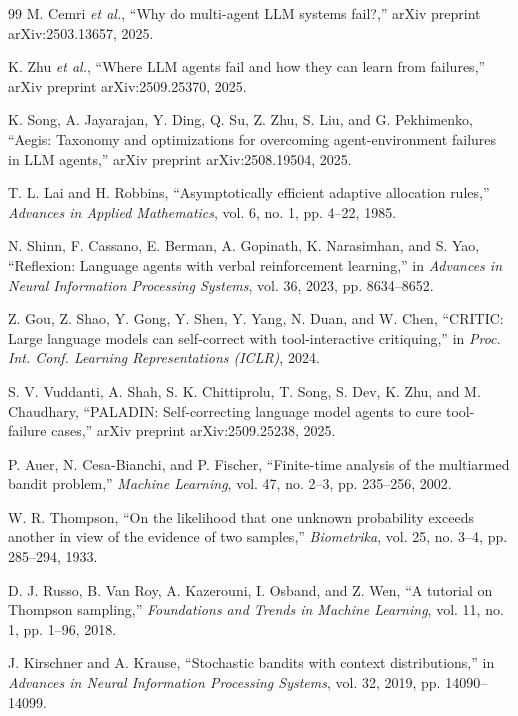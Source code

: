 \documentclass[conference]{IEEEtran}
\begin{document}
\begin{thebibliography}{99}
M. Cemri \emph{et al.}, ``Why do multi-agent LLM systems fail?,'' arXiv preprint arXiv:2503.13657, 2025.

K. Zhu \emph{et al.}, ``Where LLM agents fail and how they can learn from failures,'' arXiv preprint arXiv:2509.25370, 2025.

K. Song, A. Jayarajan, Y. Ding, Q. Su, Z. Zhu, S. Liu, and G. Pekhimenko, ``Aegis: Taxonomy and optimizations for overcoming agent-environment failures in LLM agents,'' arXiv preprint arXiv:2508.19504, 2025.

T. L. Lai and H. Robbins, ``Asymptotically efficient adaptive allocation rules,'' \emph{Advances in Applied Mathematics}, vol. 6, no. 1, pp. 4--22, 1985.

N. Shinn, F. Cassano, E. Berman, A. Gopinath, K. Narasimhan, and S. Yao, ``Reflexion: Language agents with verbal reinforcement learning,'' in \emph{Advances in Neural Information Processing Systems}, vol. 36, 2023, pp. 8634--8652.

Z. Gou, Z. Shao, Y. Gong, Y. Shen, Y. Yang, N. Duan, and W. Chen, ``CRITIC: Large language models can self-correct with tool-interactive critiquing,'' in \emph{Proc. Int. Conf. Learning Representations (ICLR)}, 2024.

S. V. Vuddanti, A. Shah, S. K. Chittiprolu, T. Song, S. Dev, K. Zhu, and M. Chaudhary, ``PALADIN: Self-correcting language model agents to cure tool-failure cases,'' arXiv preprint arXiv:2509.25238, 2025.

P. Auer, N. Cesa-Bianchi, and P. Fischer, ``Finite-time analysis of the multiarmed bandit problem,'' \emph{Machine Learning}, vol. 47, no. 2--3, pp. 235--256, 2002.

W. R. Thompson, ``On the likelihood that one unknown probability exceeds another in view of the evidence of two samples,'' \emph{Biometrika}, vol. 25, no. 3--4, pp. 285--294, 1933.

D. J. Russo, B. Van Roy, A. Kazerouni, I. Osband, and Z. Wen, ``A tutorial on Thompson sampling,'' \emph{Foundations and Trends in Machine Learning}, vol. 11, no. 1, pp. 1--96, 2018.

J. Kirschner and A. Krause, ``Stochastic bandits with context distributions,'' in \emph{Advances in Neural Information Processing Systems}, vol. 32, 2019, pp. 14090--14099.


\end{thebibliography}
\end{document}
